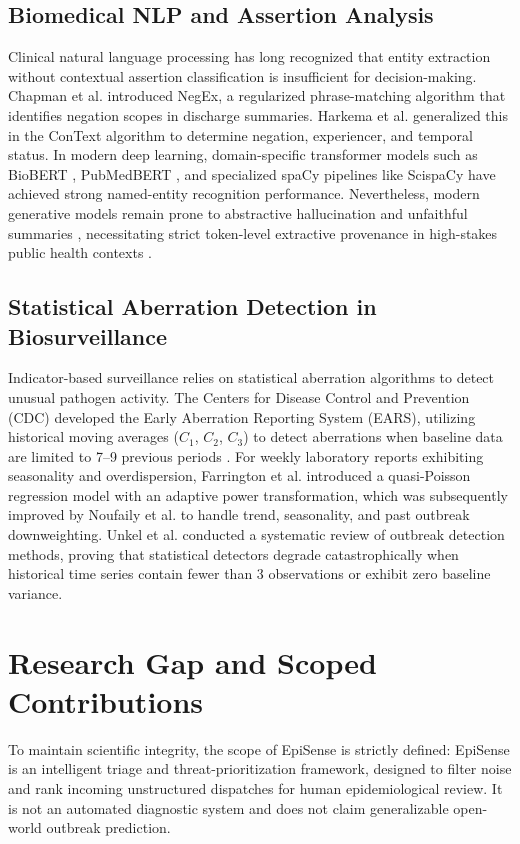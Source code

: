 \documentclass[conference]{IEEEtran}
\begin{document}
\subsection{Biomedical NLP and Assertion Analysis}
Clinical natural language processing has long recognized that entity extraction without contextual assertion classification is insufficient for decision-making. Chapman et al. \cite{Chapman2001} introduced NegEx, a regularized phrase-matching algorithm that identifies negation scopes in discharge summaries. Harkema et al. \cite{Harkema2009} generalized this in the ConText algorithm to determine negation, experiencer, and temporal status. In modern deep learning, domain-specific transformer models such as BioBERT \cite{Lee2020}, PubMedBERT \cite{Gu2021}, and specialized spaCy pipelines like ScispaCy \cite{Neumann2019} have achieved strong named-entity recognition performance. Nevertheless, modern generative models remain prone to abstractive hallucination and unfaithful summaries \cite{Maynez2020,Ji2023}, necessitating strict token-level extractive provenance in high-stakes public health contexts \cite{Rudin2019}.

\subsection{Statistical Aberration Detection in Biosurveillance}
Indicator-based surveillance relies on statistical aberration algorithms to detect unusual pathogen activity. The Centers for Disease Control and Prevention (CDC) developed the Early Aberration Reporting System (EARS), utilizing historical moving averages ($C_1$, $C_2$, $C_3$) to detect aberrations when baseline data are limited to 7--9 previous periods \cite{Hutwagner2003,Hutwagner2005}. For weekly laboratory reports exhibiting seasonality and overdispersion, Farrington et al. \cite{Farrington1996} introduced a quasi-Poisson regression model with an adaptive power transformation, which was subsequently improved by Noufaily et al. \cite{Noufaily2013} to handle trend, seasonality, and past outbreak downweighting. Unkel et al. \cite{Unkel2012} conducted a systematic review of outbreak detection methods, proving that statistical detectors degrade catastrophically when historical time series contain fewer than 3 observations or exhibit zero baseline variance.

\section{Research Gap and Scoped Contributions}
To maintain scientific integrity, the scope of EpiSense is strictly defined: EpiSense is an intelligent triage and threat-prioritization framework, designed to filter noise and rank incoming unstructured dispatches for human epidemiological review. It is not an automated diagnostic system and does not claim generalizable open-world outbreak prediction.
\end{document}
